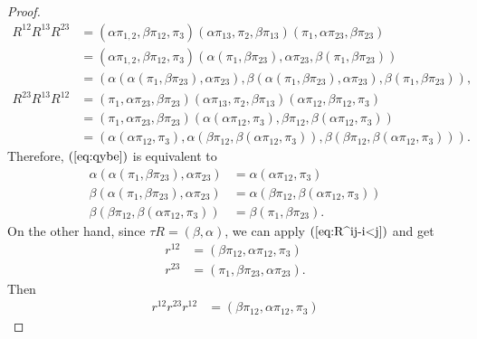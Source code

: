 \begin{proof}
    \begin{align*}
        R^{12}R^{13}R^{23} &= (\alpha\pi_{1,2},\beta\pi_{12},\pi_3)
                (\alpha\pi_{13},\pi_2,\beta\pi_{13})
                (\pi_1,\alpha\pi_{23},\beta\pi_{23})\\
            &= (\alpha\pi_{1,2},\beta\pi_{12},\pi_3)
                (\alpha(\pi_1,\beta\pi_{23})
                ,\alpha\pi_{23}
                ,\beta(\pi_1,\beta\pi_{23}))\\
            &= (\alpha(\alpha(\pi_1,\beta\pi_{23}),\alpha\pi_{23})
                ,\beta(\alpha(\pi_1,\beta\pi_{23}),\alpha\pi_{23})
                ,\beta(\pi_1,\beta\pi_{23})),\\
        R^{23}R^{13}R^{12} &= (\pi_1,\alpha\pi_{23},\beta\pi_{23})
                (\alpha\pi_{13},\pi_2,\beta\pi_{13})
                (\alpha\pi_{12},\beta\pi_{12},\pi_3)\\
            &= (\pi_1,\alpha\pi_{23},\beta\pi_{23})
                (\alpha(\alpha\pi_{12},\pi_3)
                ,\beta\pi_{12}
                ,\beta(\alpha\pi_{12},\pi_3))\\
            &= (\alpha(\alpha\pi_{12},\pi_3)
                ,\alpha(\beta\pi_{12},\beta(\alpha\pi_{12},\pi_3))
                ,\beta(\beta\pi_{12},\beta(\alpha\pi_{12},\pi_3))).
    \end{align*}
    Therefore, $(\ref{eq:qybe})$ is equivalent to
    \begin{align}\label{eq:qybe-no-flip}
        \alpha(\alpha(\pi_1,\beta\pi_{23}),\alpha\pi_{23})
            &= \alpha(\alpha\pi_{12},\pi_3)\nonumber\\
        \beta(\alpha(\pi_1,\beta\pi_{23}),\alpha\pi_{23})
            &= \alpha(\beta\pi_{12},\beta(\alpha\pi_{12},\pi_3))\\
        \beta(\beta\pi_{12},\beta(\alpha\pi_{12},\pi_3))
            &= \beta(\pi_1,\beta\pi_{23}).\nonumber
    \end{align}
    On the other hand, since $\tau R=(\beta,\alpha)$, we can apply $(\ref{eq:R^ij-i<j})$ and get
    \begin{align*}
        r^{12} &= (\beta\pi_{12},\alpha\pi_{12},\pi_3)\\
        r^{23} &= (\pi_1,\beta\pi_{23},\alpha\pi_{23}).
    \end{align*}
    Then
    \begin{align*}
        r^{12}r^{23}r^{12} &= (\beta\pi_{12},\alpha\pi_{12},\pi_3)

\end{align*}
\end{proof}
